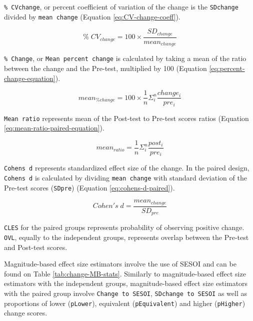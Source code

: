 \documentclass[
]{book}
\begin{document}
\texttt{\%\ CVchange}, or percent coefficient of variation of the change is the \texttt{SDchange} divided by \texttt{mean\ change} (Equation \eqref{eq:CV-change-coeff}).

\begin{equation}
  \%\;CV_{change} = 100\times\frac{SD_{change}}{mean_{change}}
  \label{eq:CV-change-coeff}
\end{equation}

\texttt{\%\ Change}, or \texttt{Mean\ percent\ change} is calculated by taking a mean of the ratio between the change and the Pre-test, multiplied by 100 (Equation \eqref{eq:percent-change-equation}).

\begin{equation}
  mean_{\% change} = 100\times\frac{1}{n}\Sigma_{i}^{n}\frac{change_{i}}{pre_{i}}
 \label{eq:percent-change-equation}
\end{equation}

\texttt{Mean\ ratio} represents mean of the Post-test to Pre-test scores ratios (Equation \eqref{eq:mean-ratio-paired-equation}).

\begin{equation}
  mean_{ratio} = \frac{1}{n}\Sigma_{i}^{n}\frac{post_{i}}{pre_{i}}
  \label{eq:mean-ratio-paired-equation}
\end{equation}

\texttt{Cohen\textquotesingle{}s\ d} represents standardized effect size of the change. In the paired design, \texttt{Cohen\textquotesingle{}s\ d} is calculated by dividing \texttt{mean\ change} with standard deviation of the Pre-test scores (\texttt{SDpre}) (Equation \eqref{eq:cohens-d-paired}).

\begin{equation}
  Cohen's\;d = \frac{mean_{change}}{SD_{pre}}
  \label{eq:cohens-d-paired}
\end{equation}

\texttt{CLES} for the paired groups represents probability of observing positive change. \texttt{OVL}, equally to the independent groups, represents overlap between the Pre-test and Post-test scores.

Magnitude-based effect size estimators involve the use of SESOI and can be found on Table \ref{tab:change-MB-stats}. Similarly to magnitude-based effect size estimators with the independent groups, magnitude-based effect size estimators with the paired group involve \texttt{Change\ to\ SESOI}, \texttt{SDchange\ to\ SESOI} as well as proportions of lower (\texttt{pLower}), equivalent (\texttt{pEquivalent}) and higher (\texttt{pHigher}) change scores.
\end{document}
